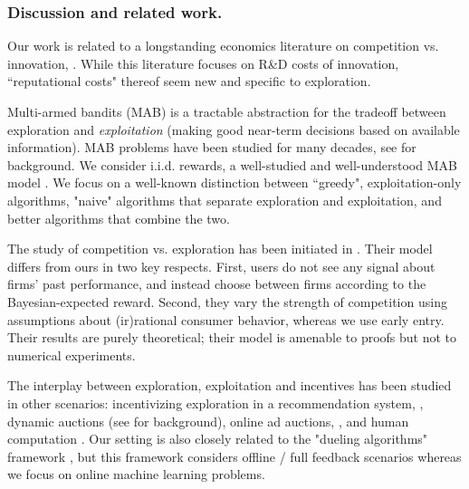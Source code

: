 \documentclass[../competing_bandits.tex]{subfiles}
\begin{document}
\subsubsection{Discussion and related work.}
Our work is related to a longstanding economics literature on competition vs. innovation, \eg \cite{Schumpeter-42,barro2004economic,Aghion-QJE05}. While this literature focuses on R\&D costs of innovation, ``reputational costs" thereof seem new and specific to exploration.

Multi-armed bandits (MAB) is a tractable abstraction for the tradeoff between exploration and \emph{exploitation} (making good near-term decisions based on available information). MAB problems have been studied for many decades, see \cite{Bubeck-survey12} for background. We consider i.i.d. rewards, a well-studied and well-understood MAB model \cite{bandits-ucb1}. We focus on a well-known distinction between ``greedy", exploitation-only algorithms, "naive" algorithms that separate exploration and exploitation, and better algorithms that combine the two. 

The study of competition vs. exploration has been initiated in \cite{CompetingBandits-itcs16}. Their model differs from ours in two key respects. First, users do not see any signal about firms' past performance, and instead choose between firms according to the Bayesian-expected reward. Second, they vary the strength of competition using assumptions about (ir)rational consumer behavior, whereas we use early entry. Their results are purely theoretical; their model is amenable to proofs but not to numerical experiments.

The interplay between exploration, exploitation and incentives has been studied in other scenarios: incentivizing exploration in a recommendation system,
    \eg \cite{Kremer-JPE14,Frazier-ec14,Che-13,ICexploration-ec15,Bimpikis-exploration-ms17},
dynamic auctions
    (see \cite{DynAuctions-survey10} for background),
online ad auctions, \eg
    \cite{MechMAB-ec09,DevanurK09,NSV08,Transform-ec10-jacm,Amin-auctions-nips13},
and human computation
    \cite{RepeatedPA-ec14,Ghosh-itcs13,Krause-www13}.
Our setting is also closely related to the "dueling algorithms" framework \cite{DuelingAlgs-stoc11}, but this framework considers offline / full feedback scenarios whereas we focus on online machine learning problems.
\end{document}

